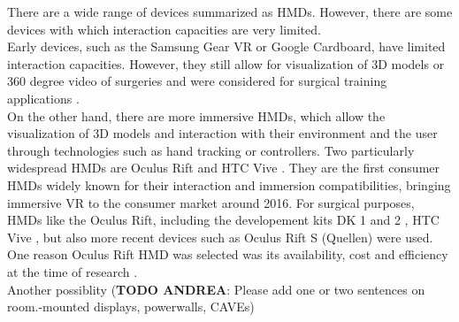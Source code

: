 There are a wide range of devices summarized as HMDs.
However, there are some devices with which interaction capacities are very limited.
\\ Early devices, such as the Samsung Gear VR or Google Cardboard, have limited interaction capacities.
However, they still allow for visualization of 3D models or 360 degree video of surgeries and were considered for surgical training applications \cite{sararit2017vr, gomez2019techniques}.
\\ On the other hand, there are more immersive HMDs, which allow the visualization of 3D models and interaction with their environment and the user through technologies such as hand tracking or controllers.
Two particularly widespread HMDs are Oculus Rift \cite{OculusRift} and HTC Vive \cite{Vive}.
They are the first consumer HMDs widely known for their interaction and immersion compatibilities, bringing immersive VR to the consumer market around 2016.
For surgical purposes, HMDs like the Oculus Rift, including the developement kits DK 1 and 2 \cite{Parham.2019, Pulijala.2017,Sampogna.2017}, HTC Vive \cite{.2017, Barber.2020}, but also more recent devices such as Oculus Rift S (Quellen) were used.
\\ One reason Oculus Rift HMD was selected was its availability, cost and efficiency at the time of research \cite{Pulijala.2017}.
\\ Another possiblity (\textbf{TODO ANDREA}: Please add one or two sentences on room.-mounted displays, powerwalls, CAVEs)